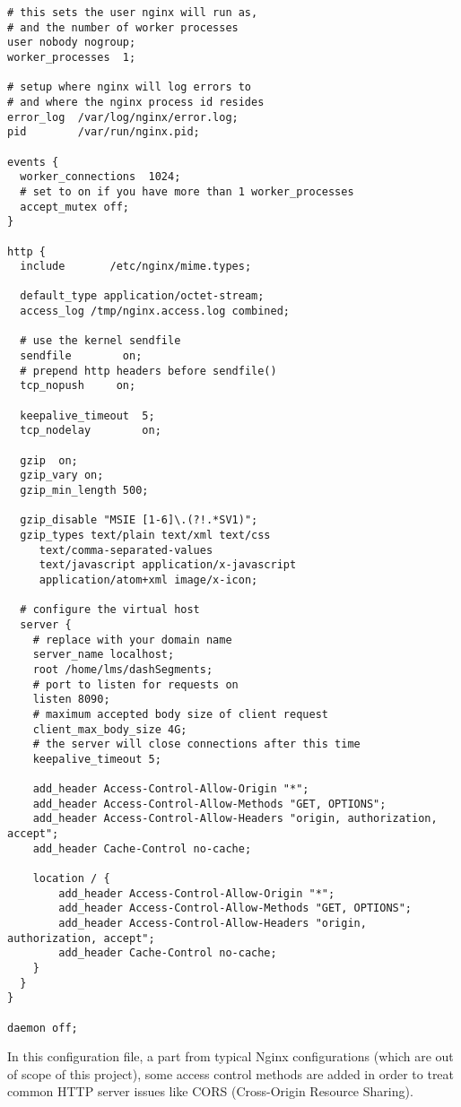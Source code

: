 \begin{verbatim}
# this sets the user nginx will run as, 
# and the number of worker processes
user nobody nogroup;
worker_processes  1;

# setup where nginx will log errors to 
# and where the nginx process id resides
error_log  /var/log/nginx/error.log;
pid        /var/run/nginx.pid;

events {
  worker_connections  1024;
  # set to on if you have more than 1 worker_processes 
  accept_mutex off;
}

http {
  include       /etc/nginx/mime.types;

  default_type application/octet-stream;
  access_log /tmp/nginx.access.log combined;
 
  # use the kernel sendfile
  sendfile        on;
  # prepend http headers before sendfile() 
  tcp_nopush     on;

  keepalive_timeout  5;
  tcp_nodelay        on;

  gzip  on;
  gzip_vary on;
  gzip_min_length 500;
  
  gzip_disable "MSIE [1-6]\.(?!.*SV1)";
  gzip_types text/plain text/xml text/css
     text/comma-separated-values
     text/javascript application/x-javascript
     application/atom+xml image/x-icon;

  # configure the virtual host
  server {
    # replace with your domain name
    server_name localhost;
    root /home/lms/dashSegments;
    # port to listen for requests on
    listen 8090;
    # maximum accepted body size of client request 
    client_max_body_size 4G;
    # the server will close connections after this time 
    keepalive_timeout 5;
    
    add_header Access-Control-Allow-Origin "*";
    add_header Access-Control-Allow-Methods "GET, OPTIONS";
    add_header Access-Control-Allow-Headers "origin, authorization, accept";
    add_header Cache-Control no-cache;
    
    location / {
        add_header Access-Control-Allow-Origin "*";
        add_header Access-Control-Allow-Methods "GET, OPTIONS";
        add_header Access-Control-Allow-Headers "origin, authorization, accept";
        add_header Cache-Control no-cache;
    }
  }
}

daemon off;
\end{verbatim}

In this configuration file, a part from typical Nginx configurations (which are out of scope of this project), some access control methods are added in order to treat common HTTP server issues like CORS (Cross-Origin Resource Sharing).

